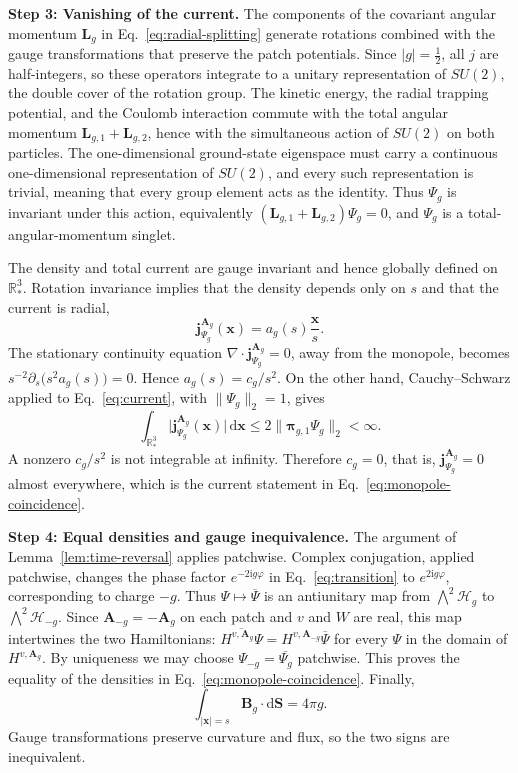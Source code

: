 \documentclass[11pt,a4paper]{article}
\theoremstyle{remark}
\theoremstyle{plain}
\newcommand{\R}{\mathbb R}
\newcommand{\jj}{\mathbf j}
\newcommand{\A}{\mathbf A}
\newcommand{\B}{\mathbf B}
\newcommand{\bpi}{\boldsymbol\pi}
\newcommand{\cH}{\mathcal H}
\begin{document}
\noindent\textbf{Step 3: Vanishing of the current.}
The components of the covariant angular momentum $\mathbf L_g$ in
Eq.~\eqref{eq:radial-splitting} generate rotations combined with the
gauge transformations that preserve the patch potentials. Since
$|g|=\tfrac12$, all $j$ are half-integers, so these operators
integrate to a unitary representation of $SU(2)$, the double cover of
the rotation group. The kinetic energy, the radial trapping potential, and the
Coulomb interaction commute with the total angular momentum
$\mathbf L_{g,1}+\mathbf L_{g,2}$, hence with the simultaneous action
of $SU(2)$ on both particles. The one-dimensional ground-state
eigenspace must carry a continuous one-dimensional representation of
$SU(2)$, and every such representation is trivial, meaning that every
group element acts as the identity. Thus $\Psi_g$
is invariant under this action, equivalently
$(\mathbf L_{g,1}+\mathbf L_{g,2})\Psi_g=0$, and $\Psi_g$ is a
total-angular-momentum singlet.

The density and total current are gauge invariant and hence globally
defined on $\R^3_*$. Rotation invariance implies that the density
depends only on $s$ and that the current is radial,
\begin{equation}
 \jj_{\Psi_g}^{\A_g}(\mathbf x)=a_g(s)\frac{\mathbf x}{s}.
\end{equation}
The stationary continuity equation
$\nabla\cdot\jj_{\Psi_g}^{\A_g}=0$, away from the monopole,
becomes $s^{-2}\partial_s\bigl(s^2a_g(s)\bigr)=0$. Hence
$a_g(s)=c_g/s^2$.
On the other hand, Cauchy--Schwarz applied to
Eq.~\eqref{eq:current}, with $\|\Psi_g\|_2=1$, gives
\begin{equation}
 \int_{\R^3_*}\bigl|\jj_{\Psi_g}^{\A_g}(\mathbf x)\bigr|\,\mathrm{d}\mathbf x
    \le2\|\bpi_{g,1}\Psi_g\|_2<\infty.
\end{equation}
A nonzero $c_g/s^2$ is not integrable at infinity. Therefore $c_g=0$,
that is, $\jj_{\Psi_g}^{\A_g}=0$ almost everywhere, which is the
current statement in Eq.~\eqref{eq:monopole-coincidence}.

\noindent\textbf{Step 4: Equal densities and gauge inequivalence.}
The argument of Lemma~\ref{lem:time-reversal} applies patchwise.
Complex conjugation, applied patchwise, changes the phase factor
$e^{-2\mathrm{i}g\varphi}$ in Eq.~\eqref{eq:transition} to
$e^{2\mathrm{i}g\varphi}$, corresponding to charge $-g$.
Thus $\Psi\mapsto\overline\Psi$ is an
antiunitary map from $\bigwedge^2\cH_g$ to $\bigwedge^2\cH_{-g}$. Since $\A_{-g}=-\A_g$ on
each patch and $v$ and $W$ are real, this map intertwines the two
Hamiltonians: $\overline{H^{v,\A_g}\Psi}=H^{v,\A_{-g}}\overline\Psi$
for every $\Psi$ in the domain of $H^{v,\A_g}$. By uniqueness we may choose
$\Psi_{-g}=\overline{\Psi_g}$ patchwise. This proves the equality of the
densities in Eq.~\eqref{eq:monopole-coincidence}. Finally,
\begin{equation}
 \int_{|\mathbf x|=s}\B_g\cdot\mathrm{d}\mathbf S=4\pi g.
 \label{eq:flux}
\end{equation}
Gauge transformations preserve curvature and flux, so the two signs are
inequivalent.
\end{document}
